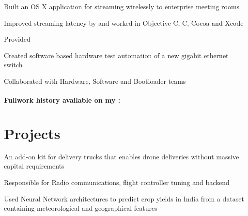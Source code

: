 \documentclass[]{deedy-resume-openfont}
\begin{document}
\begin{minipage}[t]{0.64\textwidth}
\begin{tightemize}
\item Built an OS X application for streaming wirelessly to enterprise meeting rooms 
\item Improved streaming latency by  and worked in Objective-C, C, Cocoa
  and Xcode
\item Provided 
\end{tightemize}
\sectionsep


\begin{tightemize}
\item Created software based hardware test automation of a new gigabit ethernet switch
\item Collaborated with Hardware, Software and Bootloader teams 
\end{tightemize}
\paragraph{Fullwork history available on my : \href{https://www.linkedin.com/in/prajnak}{}}


\section{Projects}
\begin{tightemize}
\item An add-on kit for delivery trucks that enables drone deliveries without massive capital requirements
\item Responsible for Radio communications, flight controller tuning and backend
\end{tightemize}
\sectionsep

\begin{tightemize}
\item Used Neural Network architectures to predict crop yields in India from a
  dataset containing meteorological and geographical features
\end{tightemize}
\sectionsep


\end{minipage}
\end{document}
